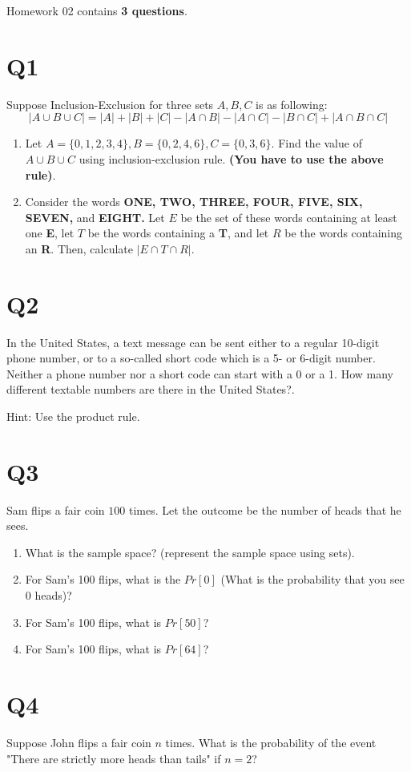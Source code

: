 \documentclass[12pt]{exam}
\begin{document}
Homework 02 contains \textbf{3 questions}.

\section{Q1}
Suppose Inclusion-Exclusion for three sets $A,B,C$ is as following:
\[|A \cup B \cup C| = |A| + |B| + |C| - |A \cap B | - |A \cap C| - |B \cap C| + |A \cap B \cap C|\]

\begin{enumerate}
    \item Let $A = \{0,1,2,3,4\}, B = \{0,2,4,6\}, C = \{0,3,6\}$. Find the value of $A \cup B \cup C$ using inclusion-exclusion rule. \textbf{(You have to use the above rule)}.
    \item Consider the words \textbf{ONE, TWO, THREE, FOUR, FIVE, SIX, SEVEN,} and \textbf{EIGHT.} Let $E$ be the set of these words containing at least one \textbf{E}, let $T$ be the words containing a \textbf{T}, and let $R$ be the words containing an \textbf{R}. Then, calculate $|E \cap T \cap R|$.
\end{enumerate}

\section{Q2} 
In the United States, a text message can be sent either to a regular 10-digit phone number, or to a so-called short code which is a 5- or 6-digit number. Neither a phone number nor a short code can start with a 0 or a 1. How many different textable numbers are there in the United States?.

Hint: Use the product rule.


\section{Q3}
Sam flips a fair coin $100$ times. Let the outcome be the number of heads that he sees.


\begin{enumerate}
    \item What is the sample space? (represent the sample space using sets).
    \item For Sam's 100 flips, what is the $Pr[0]$ (What is the probability that you see 0 heads)?
    \item For Sam's 100 flips, what is $Pr[50]$?
    \item For Sam's 100 flips, what is $Pr[64]$?
\end{enumerate}


\section{Q4}
Suppose John flips a fair coin $n$ times. What is the probability of the event "There are strictly more heads than tails" if $n=2$?
\end{document}
